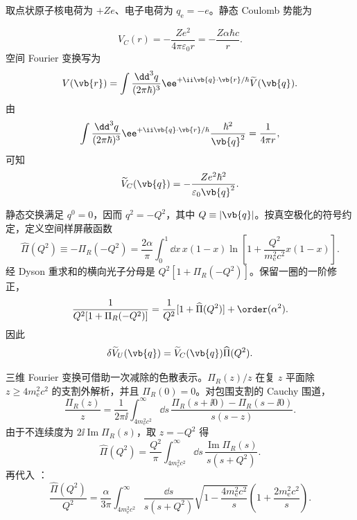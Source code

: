 \begin{derivation}[真空极化怎样修正静态势能]
取点状原子核电荷为 $+Ze$、电子电荷为 $q_{\mathrm e}=-e$。静态 Coulomb 势能为

\begin{equation*}
 V_C(r)=-\frac{Ze^2}{4\pi\varepsilon_0r}
 =-\frac{Z\alpha\hbar c}{r}.
 \end{equation*}
空间 Fourier 变换写为
\begin{equation*}
 V(\vb{r})
 =\int\frac{\dd^3 q}{(2\pi\hbar)^3}
 \ee^{+\ii\vb{q}\cdot\vb{r}/\hbar}
 \widetilde V(\vb{q}).
 \end{equation*}
由
\begin{equation*}
 \int\frac{\dd^3 q}{(2\pi\hbar)^3}
 \ee^{+\ii\vb{q}\cdot\vb{r}/\hbar}
 \frac{\hbar^2}{\vb{q}^2}
 =\frac1{4\pi r},
\end{equation*}
可知
\begin{equation*}
 \widetilde V_C(\vb{q})
 =-\frac{Ze^2\hbar^2}{\varepsilon_0\vb{q}^2}.
 \end{equation*}

静态交换满足 $q^0=0$，因而 $q^2=-Q^2$，其中 $Q\equiv|\vb{q}|$。按真空极化的符号约定，定义空间样屏蔽函数
\begin{equation*}
 \widehat\Pi(Q^2)
 \equiv-\Pi_R(-Q^2)
 =\frac{2\alpha}{\pi}
 \int_0^1\dd x\,x(1-x)
 \ln\left[1+\frac{Q^2}{m_{\mathrm e}^2c^2}x(1-x)\right].
 \end{equation*}
经 Dyson 重求和的横向光子分母是 $Q^2[1+\Pi_R(-Q^2)]$。保留一圈的一阶修正，
\begin{equation*}
 \frac1{Q^2[1+\Pi_R(-Q^2)]}
 =\frac1{Q^2}[1+\widehat\Pi(Q^2)]+
 \order(\alpha^2).
\end{equation*}
因此
\begin{equation*}
 \delta\widetilde V_U(\vb{q})
 =\widetilde V_C(\vb{q})\widehat\Pi(Q^2).
 \end{equation*}

三维 Fourier 变换可借助一次减除的色散表示。$\Pi_R(z)/z$ 在复 $z$ 平面除 $z\ge4m_{\mathrm e}^2c^2$ 的支割外解析，并且 $\Pi_R(0)=0$。对包围支割的 Cauchy 围道，
\begin{equation*}
 \frac{\Pi_R(z)}{z}
 =\frac1{2\pi\ii}
 \int_{4m_{\mathrm e}^2c^2}^{\infty}\dd s\,
 \frac{\Pi_R(s+\ii0)-\Pi_R(s-\ii0)}{s(s-z)}.
\end{equation*}
由于不连续度为 $2\ii\operatorname{Im}\Pi_R(s)$，取 $z=-Q^2$ 得
\begin{equation*}
 \widehat\Pi(Q^2)
 =\frac{Q^2}{\pi}
 \int_{4m_{\mathrm e}^2c^2}^{\infty}\dd s\,
 \frac{\operatorname{Im}\Pi_R(s)}{s(s+Q^2)}.
 \end{equation*}
再代入 ：
\begin{equation*}
 \frac{\widehat\Pi(Q^2)}{Q^2}
 =\frac{\alpha}{3\pi}
 \int_{4m_{\mathrm e}^2c^2}^{\infty}\frac{\dd s}{s(s+Q^2)}
 \sqrt{1-\frac{4m_{\mathrm e}^2c^2}{s}}
 \left(1+\frac{2m_{\mathrm e}^2c^2}{s}\right).
 \end{equation*}


\end{derivation}

